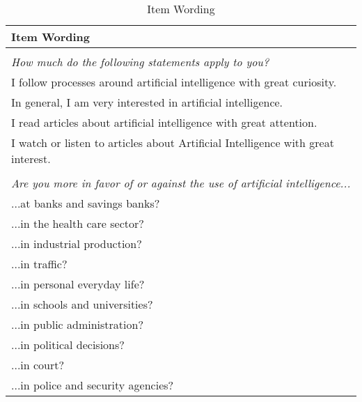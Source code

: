 \documentclass{article}
\begin{document}
\begin{table}[H]

\caption{\label{tab:unnamed-chunk-8}Item Wording}
\centering
\begin{tabu} to 
\toprule
Item Wording\\
\midrule
\addlinespace[0.3em]
\\
\em{\hspace{1em}How much do the following statements apply to you?}\\
\hspace{1em}I follow processes around artificial intelligence with great curiosity.\\
\hspace{1em}In general, I am very interested in artificial intelligence.\\
\hspace{1em}I read articles about artificial intelligence with great attention.\\
\hspace{1em}I watch or listen to articles about Artificial Intelligence with great interest.\\
\addlinespace[0.3em]
\\
\em{\hspace{1em}Are you more in favor of or against the use of artificial intelligence...}\\
\hspace{1em}...at banks and savings banks?\\
\hspace{1em}...in the health care sector?\\
\hspace{1em}...in industrial production?\\
\hspace{1em}...in traffic?\\
\hspace{1em}...in personal everyday life?\\
\hspace{1em}...in schools and universities?\\
\hspace{1em}...in public administration?\\
\hspace{1em}...in political decisions?\\
\hspace{1em}...in court?\\
\hspace{1em}...in police and security agencies?\\

\end{tabu}
\end{table}
\end{document}
